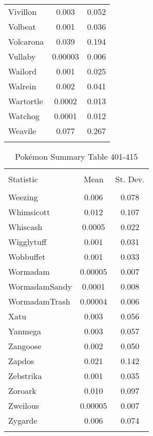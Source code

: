 \documentclass[12pt,twoside]{reedthesis}
\begin{document}
\begin{table}[!htbp]
\begin{tabular}{@{\extracolsep{5pt}}lcc}
  Vivillon & 0.003 & 0.052 \\ 
  Volbeat & 0.001 & 0.036 \\ 
  Volcarona & 0.039 & 0.194 \\ 
  Vullaby & 0.00003 & 0.006 \\ 
  Wailord & 0.001 & 0.025 \\ 
  Walrein & 0.002 & 0.041 \\ 
  Wartortle & 0.0002 & 0.013 \\ 
  Watchog & 0.0001 & 0.012 \\ 
  Weavile & 0.077 & 0.267 \\ 
  \hline \\[-1.8ex] 
  \end{tabular} 
  \end{table}
  
  \begin{table}[!htbp] \centering 
    \caption{Pokémon Summary Table 401-415} 
    \label{} 
  \begin{tabular}{@{\extracolsep{5pt}}lcc} 
  \\[-1.8ex]\hline 
  \hline \\[-1.8ex] 
  Statistic & \multicolumn{1}{c}{Mean} & \multicolumn{1}{c}{St. Dev.} \\ 
  \hline \\[-1.8ex] 
  Weezing & 0.006 & 0.078 \\ 
  Whimsicott & 0.012 & 0.107 \\ 
  Whiscash & 0.0005 & 0.022 \\ 
  Wigglytuff & 0.001 & 0.031 \\ 
  Wobbuffet & 0.001 & 0.033 \\ 
  Wormadam & 0.00005 & 0.007 \\ 
  WormadamSandy & 0.0001 & 0.008 \\ 
  WormadamTrash & 0.00004 & 0.006 \\ 
  Xatu & 0.003 & 0.056 \\ 
  Yanmega & 0.003 & 0.057 \\ 
  Zangoose & 0.002 & 0.050 \\ 
  Zapdos & 0.021 & 0.142 \\ 
  Zebstrika & 0.001 & 0.035 \\ 
  Zoroark & 0.010 & 0.097 \\ 
  Zweilous & 0.00005 & 0.007 \\ 
  Zygarde & 0.006 & 0.074 \\ 
  \hline \\[-1.8ex] 
  \end{tabular} 
  \end{table}
  
\end{document}
